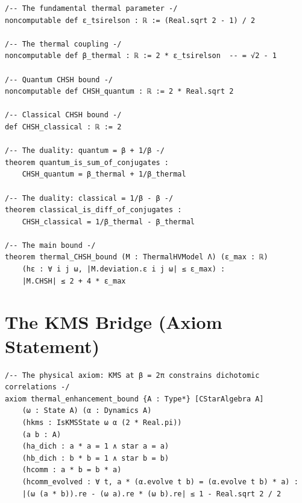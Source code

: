 \documentclass[12pt,a4paper]{article}
\begin{document}
\begin{verbatim}
/-- The fundamental thermal parameter -/
noncomputable def ε_tsirelson : ℝ := (Real.sqrt 2 - 1) / 2

/-- The thermal coupling -/
noncomputable def β_thermal : ℝ := 2 * ε_tsirelson  -- = √2 - 1

/-- Quantum CHSH bound -/
noncomputable def CHSH_quantum : ℝ := 2 * Real.sqrt 2

/-- Classical CHSH bound -/
def CHSH_classical : ℝ := 2

/-- The duality: quantum = β + 1/β -/
theorem quantum_is_sum_of_conjugates :
    CHSH_quantum = β_thermal + 1/β_thermal

/-- The duality: classical = 1/β - β -/
theorem classical_is_diff_of_conjugates :
    CHSH_classical = 1/β_thermal - β_thermal

/-- The main bound -/
theorem thermal_CHSH_bound (M : ThermalHVModel Λ) (ε_max : ℝ)
    (hε : ∀ i j ω, |M.deviation.ε i j ω| ≤ ε_max) :
    |M.CHSH| ≤ 2 + 4 * ε_max
\end{verbatim}

\section{The KMS Bridge (Axiom Statement)}

\begin{verbatim}
/-- The physical axiom: KMS at β = 2π constrains dichotomic correlations -/
axiom thermal_enhancement_bound {A : Type*} [CStarAlgebra A]
    (ω : State A) (α : Dynamics A)
    (hkms : IsKMSState ω α (2 * Real.pi))
    (a b : A)
    (ha_dich : a * a = 1 ∧ star a = a)
    (hb_dich : b * b = 1 ∧ star b = b)
    (hcomm : a * b = b * a)
    (hcomm_evolved : ∀ t, a * (α.evolve t b) = (α.evolve t b) * a) :
    |(ω (a * b)).re - (ω a).re * (ω b).re| ≤ 1 - Real.sqrt 2 / 2
\end{verbatim}
\end{document}
